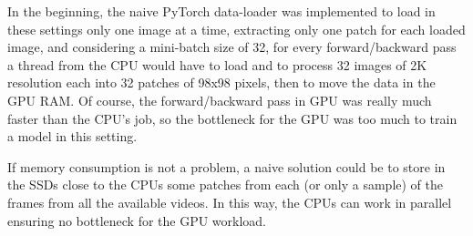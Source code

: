 In the beginning, the naive PyTorch data-loader was implemented to load in these settings only one image at a time, extracting only one patch for each loaded image, and considering a mini-batch size of 32, for every forward/backward pass a thread from the CPU would have to load and to process 32 images of 2K resolution each into 32 patches of 98x98 pixels, then to move the data in the GPU RAM. Of course, the forward/backward pass in GPU was really much faster than the CPU's job, so the bottleneck for the GPU was too much to train a model in this setting.

If memory consumption is not a problem, a naive solution could be to store in the SSDs close to the CPUs some patches from each (or only a sample) of the frames from all the available videos. In this way, the CPUs can work in parallel ensuring no bottleneck for the GPU workload.
